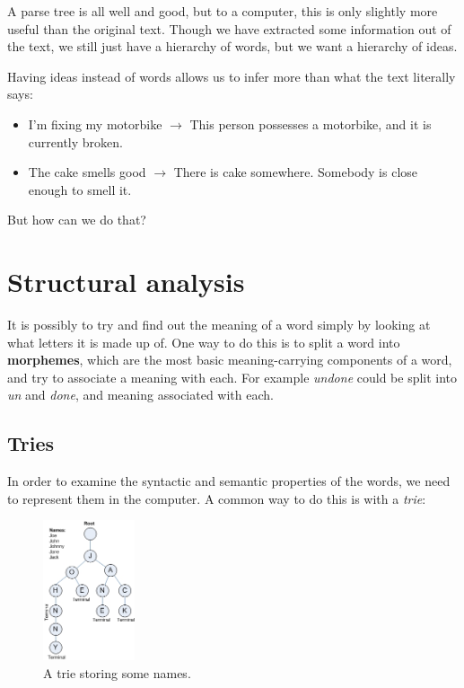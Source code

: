 A parse tree is all well and good, but to a computer, this is only slightly more
useful than the original text. Though we have extracted some information out of
the text, we still just have a hierarchy of words, but we want a hierarchy of
ideas.

Having ideas instead of words allows us to infer more than what the text
literally says:

\begin{itemize}
  \item I'm fixing my motorbike $\rightarrow$ This person possesses a
  motorbike, and it is currently broken.
  \item The cake smells good $\rightarrow$ There is cake somewhere. Somebody is
  close enough to smell it.
\end{itemize}

But how can we do that?

\section{Structural analysis}

It is possibly to try and find out the meaning of a word simply by looking at
what letters it is made up of. One way to do this is to split a word into
\textbf{morphemes}, which are the most basic meaning-carrying components of a
word, and try to associate a meaning with each. For example \textit{undone}
could be split into \textit{un} and \textit{done}, and meaning associated with
each.

\subsection{Tries}


In order to examine the syntactic and semantic properties of the words, we need to represent them in the computer. A common way to do this is with a \textit{trie}:

\begin{figure}
  \begin{center}
    \includegraphics[width=0.24\textwidth,keepaspectratio]{images/trie}
  \end{center}
  \caption{A trie storing some names.}
\end{figure}

